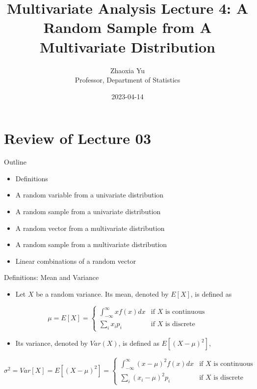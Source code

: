 \documentclass[
  ignorenonframetext,
]{beamer}
\title{Multivariate Analysis Lecture 4: A Random Sample from A
Multivariate Distribution}
\author{Zhaoxia Yu\\
Professor, Department of Statistics}
\date{2023-04-14}
\providecommand{\tightlist}{%
  \setlength{\itemsep}{0pt}\setlength{\parskip}{0pt}}
\begin{document}
\frame{\titlepage}

\hypertarget{review-of-lecture-03}{%
\section{Review of Lecture 03}\label{review-of-lecture-03}}

\begin{frame}{Outline}
\protect\hypertarget{outline}{}
\begin{itemize}
\tightlist
\item
  Definitions
\item
  A random variable from a univariate distribution
\item
  A random sample from a univariate distribution
\item
  A random vector from a multivariate distribution
\item
  A random sample from a multivariate distribution
\item
  Linear combinations of a random vector
\end{itemize}
\end{frame}

\begin{frame}{Definitions: Mean and Variance}
\protect\hypertarget{definitions-mean-and-variance}{}
\begin{itemize}
\tightlist
\item
  Let \(X\) be a random variance. Its mean, denoted by \(E[X]\), is
  defined as
\end{itemize}

\[
\mu=E[X] = \left\{
    \begin{array}{ll}
    \int_{-\infty}^{\infty} x f(x) dx & \mbox{if } X \mbox{ is continuous}\\
    \sum_{i} x_i p_i & \mbox{if } X \mbox{ is discrete}    \end{array}
\right.
\]

\begin{itemize}
\tightlist
\item
  Its variance, denoted by \(Var(X)\), is defined as \(E[(X-\mu)^2]\),
\end{itemize}

\[
\sigma^2=Var[X] = E[(X-\mu)^2] = \left\{
    \begin{array}{ll}
    \int_{-\infty}^{\infty} (x-\mu)^2 f(x) dx & \mbox{if } X \mbox{ is continuous}\\
    \sum_{i} (x_i-\mu)^2 p_i & \mbox{if } X \mbox{ is discrete}    \end{array}
\right.
\]
\end{frame}
\end{document}
